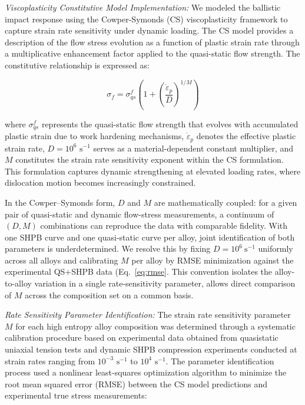 \documentclass[preprint,12pt,times]{elsarticle}  %
\begin{document}
\emph{Viscoplasticity Constitutive Model Implementation:} We modeled the ballistic impact response using the Cowper-Symonds (CS) viscoplasticity framework to capture strain rate sensitivity under dynamic loading. The CS model provides a description of the flow stress evolution as a function of plastic strain rate through a multiplicative enhancement factor applied to the quasi-static flow strength. The constitutive relationship is expressed as:

\begin{equation}
\sigma_f = \sigma_{qs}^f \left(1 + \left(\frac{\dot{\varepsilon}_p}{D}\right)^{1/M}\right)
\end{equation}

where $\sigma_{qs}^f$ represents the quasi-static flow strength that evolves with accumulated plastic strain due to work hardening mechanisms, $\dot{\varepsilon}_p$ denotes the effective plastic strain rate, $D = 10^6 \text{ s}^{-1}$ serves as a material-dependent constant multiplier, and $M$ constitutes the strain rate sensitivity exponent within the CS formulation. This formulation captures dynamic strengthening at elevated loading rates, where dislocation motion becomes increasingly constrained.

In the Cowper--Symonds form, $D$ and $M$ are mathematically coupled: for a given pair of quasi-static and dynamic flow-stress measurements, a continuum of $(D, M)$ combinations can reproduce the data with comparable fidelity. With one SHPB curve and one quasi-static curve per alloy, joint identification of both parameters is underdetermined. We resolve this by fixing $D = 10^{6}\ \text{s}^{-1}$ uniformly across all alloys and calibrating $M$ per alloy by RMSE minimization against the experimental QS+SHPB data (Eq.~\ref{eq:rmse}. This convention isolates the alloy-to-alloy variation in a single rate-sensitivity parameter, allows direct comparison of $M$ across the composition set on a common basis.

\emph{Rate Sensitivity Parameter Identification:} The strain rate sensitivity parameter $M$ for each high entropy alloy composition was determined through a systematic calibration procedure based on experimental data obtained from quasistatic uniaxial tension tests and dynamic SHPB compression experiments conducted at strain rates ranging from $10^{-3} \text{ s}^{-1}$ to $10^4 \text{ s}^{-1}$. The parameter identification process used a nonlinear least-squares optimization algorithm to minimize the root mean squared error (RMSE) between the CS model predictions and experimental true stress measurements:
\end{document}
